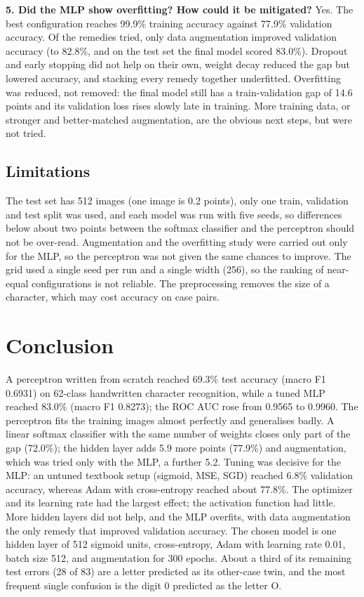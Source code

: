 \documentclass[12pt,a4paper]{article}
\begin{document}
\textbf{5. Did the MLP show overfitting? How could it be mitigated?} Yes. The best configuration
reaches 99.9\% training accuracy against
77.9\% validation accuracy. Of the remedies tried, only data
augmentation improved validation accuracy (to 82.8\%, and on
the test set the final model scored 83.0\%). Dropout and early stopping
did not help on their own, weight decay reduced the gap but lowered accuracy, and stacking every
remedy together underfitted. Overfitting was reduced, not removed: the final model still has a
train-validation gap of 14.6 points and its validation loss
rises slowly late in training. More training data, or stronger and better-matched augmentation, are
the obvious next steps, but were not tried.

\subsection*{Limitations}
The test set has 512 images (one image is 0.2 points), only one train, validation and test split was
used, and each model was run with five seeds, so differences below about two points between the
softmax classifier and the perceptron should not be over-read. Augmentation and the overfitting study
were carried out only for the MLP, so the perceptron was not given the same chances to improve. The
grid used a single seed per run and a single width (256), so the ranking of near-equal configurations
is not reliable. The preprocessing removes the size of a character, which may cost accuracy on case
pairs.

\section{Conclusion}
A perceptron written from scratch reached 69.3\% test accuracy
(macro F1 0.6931) on 62-class handwritten character recognition, while a tuned
MLP reached 83.0\% (macro F1 0.8273); the ROC AUC
rose from 0.9565 to 0.9960. The perceptron fits the training images
almost perfectly and generalises badly. A linear softmax classifier with the same number of weights
closes only part of the gap (72.0\%); the hidden layer adds
5.9 more points
(77.9\%) and augmentation, which was tried only with the MLP, a
further 5.2. Tuning was decisive for the MLP: an untuned textbook setup (sigmoid, MSE,
SGD) reached 6.8\% validation accuracy, whereas Adam with cross-entropy reached
about 77.8\%. The optimizer and its learning rate had the largest effect;
the activation function had little. More hidden layers did not help, and the MLP overfits, with
data augmentation the only remedy that improved validation accuracy. The chosen model is one hidden
layer of 512 sigmoid units, cross-entropy, Adam with learning rate 0.01, batch size 512, and
augmentation for 300 epochs. About a third of its remaining test errors (28 of 83) are a letter
predicted as its other-case twin, and the most frequent single confusion is the digit 0 predicted as
the letter O.
\end{document}

